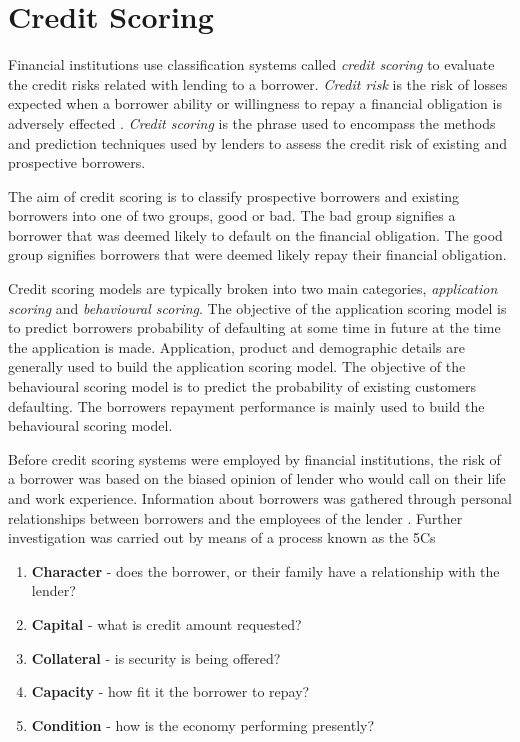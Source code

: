 \section{Credit Scoring}

Financial institutions use classification systems called \textit{credit scoring} to evaluate the credit risks related with lending to a borrower. \textit{Credit risk} is the risk of losses expected when a borrower ability or willingness to repay a financial obligation is adversely effected \citep{anderson_credit_2007}. \textit{Credit scoring} is the phrase used to encompass the methods and prediction techniques used by lenders to assess the credit risk of existing and prospective borrowers. 

The aim of credit scoring is to classify prospective borrowers and existing borrowers into one of two groups, good or bad. The bad group signifies a borrower that was deemed likely to default on the financial obligation. The good group signifies borrowers that were deemed likely repay their financial obligation.

Credit scoring models are typically broken into two main categories, \textit{application scoring} and \textit{behavioural scoring}. The objective of the application scoring model is to predict borrowers probability of defaulting at some time in future at the time the application is made. Application, product and demographic details are generally used to build the application scoring model. The objective of the behavioural scoring model is to predict the probability of existing customers defaulting. The borrowers repayment performance is mainly used to build the behavioural scoring model. 

Before credit scoring systems were employed by financial institutions, the risk of a borrower was based on the biased opinion of lender who would call on their life and work experience. Information about borrowers was gathered through personal relationships between borrowers and the employees of the lender \citep{anderson_credit_2007}. Further investigation was carried out by means of a process known as the 5Cs

\begin{enumerate}
	\renewcommand{\labelenumi}{(\roman{enumi})}  
	\item \textbf{Character} - does the borrower, or their family have a relationship with the lender?
	\item \textbf{Capital} - what is credit amount requested?
	\item \textbf{Collateral} - is security is being offered?
	\item \textbf{Capacity} - how fit it the borrower to repay?
	\item \textbf{Condition} - how is the economy performing presently?
\end{enumerate}

